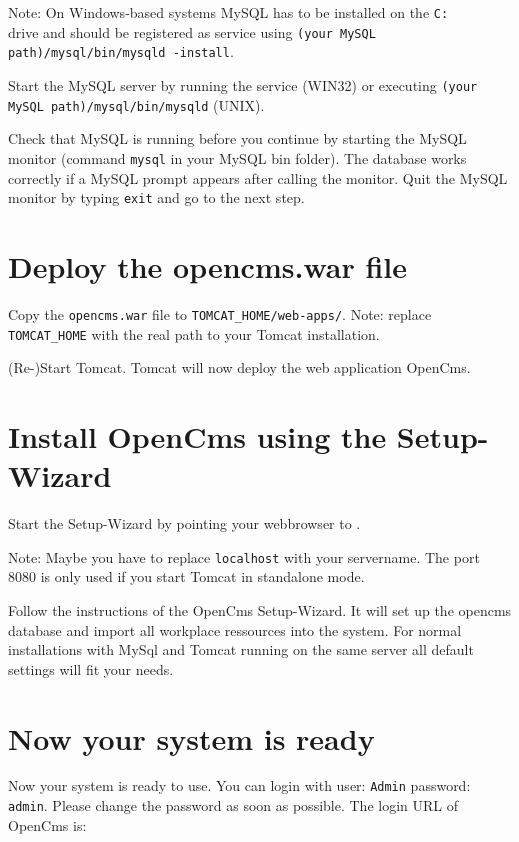 Note: On Windows-based systems MySQL has to be installed on the
\texttt{C:\\} drive and should be registered as service using
\texttt{(your MySQL path)/mysql/bin/mysqld -install}.

Start the MySQL server by running the service (WIN32) or executing
\texttt{(your MySQL path)/mysql/bin/mysqld} (UNIX).

Check that MySQL is running before you continue by starting the
MySQL monitor (command \texttt{mysql} in your MySQL bin folder).
The database works correctly if a MySQL prompt appears after
calling the monitor. Quit the MySQL monitor by typing
\texttt{exit} and go to the next step.

\section{Deploy the opencms.war file}
Copy the \texttt{opencms.war} file to
\texttt{TOMCAT\_HOME/web-apps/}. Note: replace
\texttt{TOMCAT\_HOME} with the real path to your Tomcat
installation.

(Re-)Start Tomcat. Tomcat will now deploy the web application
OpenCms.

\section{Install OpenCms using the Setup-Wizard}
Start the Setup-Wizard by pointing your webbrowser to
.

Note: Maybe you have to replace \texttt{localhost} with your
servername. The port 8080 is only used if you start Tomcat in
standalone mode.

Follow the instructions of the OpenCms Setup-Wizard. It will set
up the opencms database and import all workplace ressources into
the system. For normal installations with MySql and Tomcat running
on the same server all default settings will fit your needs.

\section{Now your system is ready}
Now your system is ready to use. You can login with user:
\texttt{Admin} password: \texttt{admin}. Please change the
password as soon as possible. The login URL of OpenCms is:

